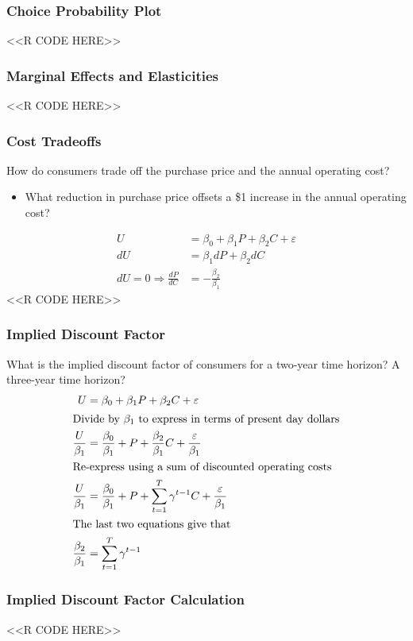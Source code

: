 \documentclass{beamer}
\begin{document}
\begin{frame}[fragile]\frametitle{Choice Probability Plot}
    <<R CODE HERE>>
\end{frame}

\begin{frame}[fragile]\frametitle{Marginal Effects and Elasticities}
    <<R CODE HERE>>
\end{frame}

\begin{frame}[fragile]\frametitle{Cost Tradeoffs}
    How do consumers trade off the purchase price and the annual operating cost?
    \begin{itemize}
        \item What reduction in purchase price offsets a \$1 increase in the annual operating cost?
    \end{itemize}
    \begin{align*}
        U &= \beta_0 + \beta_1 P + \beta_2 C + \varepsilon \\
        dU &= \beta_1 dP + \beta_2 dC \\
        dU = 0 \Rightarrow \frac{dP}{dC} &= -\frac{\beta_2}{\beta_1}
    \end{align*}
    <<R CODE HERE>>
\end{frame}

\begin{frame}\frametitle{Implied Discount Factor}
    What is the implied discount factor of consumers for a two-year time horizon? A three-year time horizon?
    \begin{align*}
        U &= \beta_0 + \beta_1 P + \beta_2 C + \varepsilon \\
        \intertext{Divide by $\beta_1$ to express in terms of present day dollars}
        \frac{U}{\beta_1} &= \frac{\beta_0}{\beta_1} + P + \frac{\beta_2}{\beta_1} C + \frac{\varepsilon}{\beta_1} \\
        \intertext{Re-express using a sum of discounted operating costs}
        \frac{U}{\beta_1} &= \frac{\beta_0}{\beta_1} + P + \sum_{t = 1}^T \gamma^{t - 1} C + \frac{\varepsilon}{\beta_1} \\
        \intertext{The last two equations give that}
        \frac{\beta_2}{\beta_1} &= \sum_{t = 1}^T \gamma^{t - 1}
    \end{align*}
\end{frame}

\begin{frame}[fragile]\frametitle{Implied Discount Factor Calculation}
    <<R CODE HERE>>
\end{frame}
\end{document}
